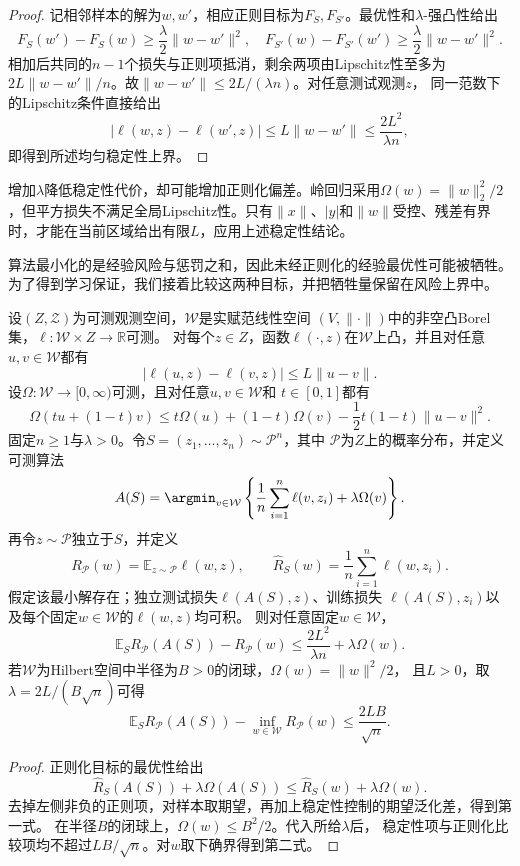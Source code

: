 \begin{proof}
记相邻样本的解为$w,w'$，相应正则目标为$F_S,F_{S'}$。最优性和$\lambda$-强凸性给出
\begin{equation*}
 F_S(w')-F_S(w)\geq\frac\lambda2\|w-w'\|^2,
 \quad
 F_{S'}(w)-F_{S'}(w')\geq\frac\lambda2\|w-w'\|^2.
\end{equation*}
相加后共同的$n-1$个损失与正则项抵消，剩余两项由Lipschitz性至多为
$2L\|w-w'\|/n$。故$\|w-w'\|\leq2L/(\lambda n)$。对任意测试观测$z$，
同一范数下的Lipschitz条件直接给出
\[
 |\ell(w,z)-\ell(w',z)|
 \leq L\|w-w'\|
 \leq\frac{2L^2}{\lambda n},
\]
即得到所述均匀稳定性上界。
\end{proof}

增加$\lambda$降低稳定性代价，却可能增加正则化偏差。岭回归采用$\Omega(w)=\|w\|_2^2/2$，但平方损失不满足全局Lipschitz性。只有$\|x\|$、$|y|$和$\|w\|$受控、残差有界时，才能在当前区域给出有限$L$，应用上述稳定性结论。

算法最小化的是经验风险与惩罚之和，因此未经正则化的经验最优性可能被牺牲。为了得到学习保证，我们接着比较这两种目标，并把牺牲量保留在风险上界中。

\begin{theorem}[正则化学习的期望风险保证]
\label{thm:regularized-learning-risk}
设$(Z,\mathcal Z)$为可测观测空间，$\mathcal W$是实赋范线性空间
$(V,\|\cdot\|)$中的非空凸Borel集，$\ell:\mathcal W\times Z\to\mathbb R$可测。
对每个$z\in Z$，函数$\ell(\cdot,z)$在$\mathcal W$上凸，并且对任意
$u,v\in\mathcal W$都有
\[
 |\ell(u,z)-\ell(v,z)|\leq L\|u-v\|.
\]
设$\Omega:\mathcal W\to[0,\infty)$可测，且对任意$u,v\in\mathcal W$和
$t\in[0,1]$都有
\[
 \Omega(tu+(1-t)v)
 \leq t\Omega(u)+(1-t)\Omega(v)-\frac12t(1-t)\|u-v\|^2.
\]
固定$n\geq1$与$\lambda>0$。令$S=(z_1,\ldots,z_n)\sim\mathcal P^n$，其中
$\mathcal P$为$Z$上的概率分布，并定义可测算法
\[
 A(S)=\argmin_{v\in\mathcal W}
 \left\{\frac1n\sum_{i=1}^n\ell(v,z_i)+\lambda\Omega(v)\right\}.
\]
再令$z\sim\mathcal P$独立于$S$，并定义
\[
 R_{\mathcal P}(w)=\mathbb E_{z\sim\mathcal P}\ell(w,z),
 \qquad
 \hat R_S(w)=\frac1n\sum_{i=1}^n\ell(w,z_i).
\]
假定该最小解存在；独立测试损失$\ell(A(S),z)$、训练损失
$\ell(A(S),z_i)$以及每个固定$w\in\mathcal W$的$\ell(w,z)$均可积。
则对任意固定$w\in\mathcal W$，
\begin{equation}
 \mathbb E_S R_{\mathcal P}(A(S))-R_{\mathcal P}(w)
 \leq\frac{2L^2}{\lambda n}+\lambda\Omega(w).
 \label{eq:regularization-excess-risk}
\end{equation}
若$\mathcal W$为Hilbert空间中半径为$B>0$的闭球，$\Omega(w)=\|w\|^2/2$，
且$L>0$，取$\lambda=2L/(B\sqrt n)$可得
\[
 \mathbb E_S R_{\mathcal P}(A(S))-\inf_{w\in\mathcal W}R_{\mathcal P}(w)
 \leq\frac{2LB}{\sqrt n}.
\]
\end{theorem}
\begin{proof}
正则化目标的最优性给出
\[
 \hat R_S(A(S))+\lambda\Omega(A(S))
 \leq\hat R_S(w)+\lambda\Omega(w).
\]
去掉左侧非负的正则项，对样本取期望，再加上稳定性控制的期望泛化差，得到第一式。
在半径$B$的闭球上，$\Omega(w)\leq B^2/2$。代入所给$\lambda$后，
稳定性项与正则化比较项均不超过$LB/\sqrt n$。对$w$取下确界得到第二式。
\end{proof}

